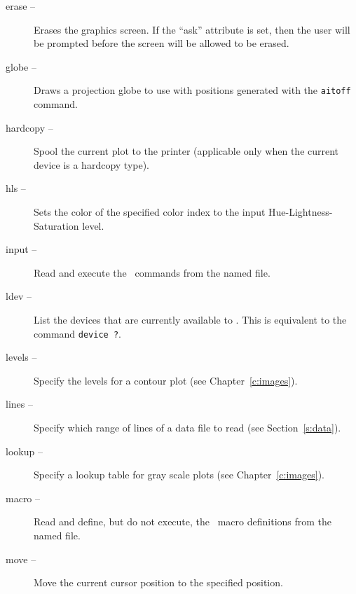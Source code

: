 \begin{description}
  \item [{erase --}] Erases the graphics
    screen.  If the ``ask'' attribute is set,
    then the user
    will be prompted before the screen will be allowed to be erased.
  \item [{globe --}]
    Draws a projection globe to use with positions generated
    with the {\tt aitoff} command.
  \item [{hardcopy --}]%
    Spool the current plot to the printer
    (applicable only when the current device is a hardcopy type).
  \item [{hls --}] Sets
    the color of the specified color index to the input
    Hue-Lightness-Saturation level.
  \item [{input --}]%
    Read and execute the \wip\ commands from the named file.
  \item [{ldev --}]%
    List the devices that are currently available to \wip.
    This is equivalent to the command
    {\tt device ?}.
  \item [{levels --}]%
    Specify the levels for a contour plot (see Chapter~\ref{c:images}).
  \item [{lines --}]%
    Specify which range of lines of a data file to read
    (see Section~\ref{s:data}).
  \item [{lookup --}]%
    Specify a lookup table for gray scale plots
    (see Chapter~\ref{c:images}).
  \item [{macro --}]%
    Read and define, but do not execute, the \wip\ macro definitions
    from the named file.
  \item [{move --}]
    Move the current cursor position to the specified position.

\end{description}
